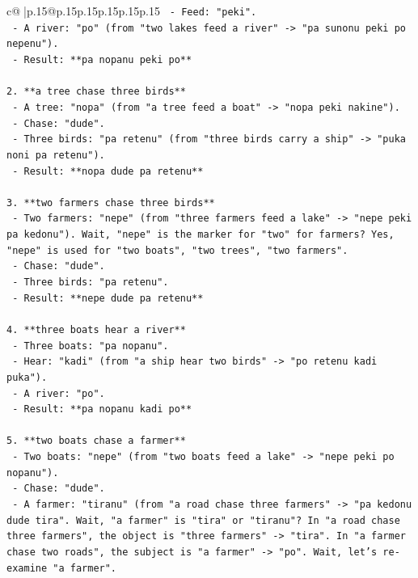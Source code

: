 \documentclass{article}
\begin{document}
{\begin{supertabular}{c@{$\;$}|p{.15\linewidth}@{}p{.15\linewidth}p{.15\linewidth}p{.15\linewidth}p{.15\linewidth}p{.15\linewidth}}
{{{\texttt{   {-} Feed: "peki".} \\
\texttt{   {-} A river: "po" (from "two lakes feed a river" {-}> "pa sunonu peki po nepenu").} \\
\texttt{   {-} Result: **pa nopanu peki po**} \\
\\ 
\texttt{2. **a tree chase three birds**} \\
\texttt{   {-} A tree: "nopa" (from "a tree feed a boat" {-}> "nopa peki nakine").} \\
\texttt{   {-} Chase: "dude".} \\
\texttt{   {-} Three birds: "pa retenu" (from "three birds carry a ship" {-}> "puka noni pa retenu").} \\
\texttt{   {-} Result: **nopa dude pa retenu**} \\
\\ 
\texttt{3. **two farmers chase three birds**} \\
\texttt{   {-} Two farmers: "nepe" (from "three farmers feed a lake" {-}> "nepe peki pa kedonu"). Wait, "nepe" is the marker for "two" for farmers? Yes, "nepe" is used for "two boats", "two trees", "two farmers".} \\
\texttt{   {-} Chase: "dude".} \\
\texttt{   {-} Three birds: "pa retenu".} \\
\texttt{   {-} Result: **nepe dude pa retenu**} \\
\\ 
\texttt{4. **three boats hear a river**} \\
\texttt{   {-} Three boats: "pa nopanu".} \\
\texttt{   {-} Hear: "kadi" (from "a ship hear two birds" {-}> "po retenu kadi puka").} \\
\texttt{   {-} A river: "po".} \\
\texttt{   {-} Result: **pa nopanu kadi po**} \\
\\ 
\texttt{5. **two boats chase a farmer**} \\
\texttt{   {-} Two boats: "nepe" (from "two boats feed a lake" {-}> "nepe peki po nopanu").} \\
\texttt{   {-} Chase: "dude".} \\
\texttt{   {-} A farmer: "tiranu" (from "a road chase three farmers" {-}> "pa kedonu dude tira". Wait, "a farmer" is "tira" or "tiranu"? In "a road chase three farmers", the object is "three farmers" {-}> "tira". In "a farmer chase two roads", the subject is "a farmer" {-}> "po". Wait, let's re{-}examine "a farmer".} \\
}}}
\end{supertabular}}
\end{document}
